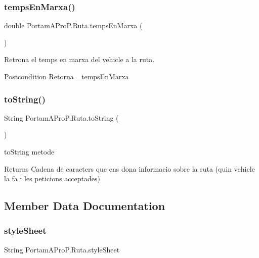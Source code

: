 \subsubsection{\texorpdfstring{temps\+En\+Marxa()}{tempsEnMarxa()}}
{\footnotesize\ttfamily double Portam\+A\+Pro\+P.\+Ruta.\+temps\+En\+Marxa (\begin{DoxyParamCaption}{ }\end{DoxyParamCaption})}



Retrona el temps en marxa del vehicle a la ruta. 

\begin{DoxyPostcond}{Postcondition}
Retorna \+\_\+temps\+En\+Marxa 
\end{DoxyPostcond}
\mbox{\label{class_portam_a_pro_p_1_1_ruta_abf345e4aeeb6bc1f7a8c813ca4d38ff9}} 
\subsubsection{\texorpdfstring{to\+String()}{toString()}}
{\footnotesize\ttfamily String Portam\+A\+Pro\+P.\+Ruta.\+to\+String (\begin{DoxyParamCaption}{ }\end{DoxyParamCaption})}



to\+String metode 

\begin{DoxyReturn}{Returns}
Cadena de caracters que ens dona informacio sobre la ruta (quin vehicle la fa i les peticions acceptades) 
\end{DoxyReturn}


\subsection{Member Data Documentation}
\mbox{\label{class_portam_a_pro_p_1_1_ruta_a5bec0cc3f5e0aac3ac137f2cde37eb4f}} 
\subsubsection{\texorpdfstring{style\+Sheet}{styleSheet}}
{\footnotesize\ttfamily String Portam\+A\+Pro\+P.\+Ruta.\+style\+Sheet\hspace{0.3cm}{\ttfamily [protected]}}

